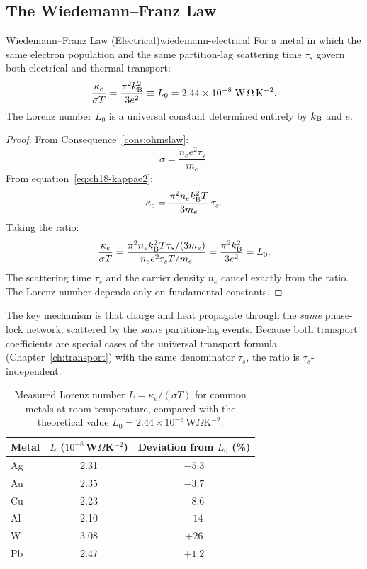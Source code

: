 \subsection{The Wiedemann--Franz Law}

\begin{consequence}{Wiedemann--Franz Law (Electrical)}{wiedemann-electrical}
For a metal in which the same electron population and the same
partition-lag scattering time $\tau_s$ govern both electrical and thermal
transport:
\begin{equation}
  \frac{\kappa_e}{\sigma T} = \frac{\pi^2 k_{\mathrm{B}}^2}{3e^2} \equiv L_0
    = 2.44\times 10^{-8}\;\mathrm{W\,\Omega\,K^{-2}}.
  \label{eq:ch18-wf}
\end{equation}
The Lorenz number $L_0$ is a universal constant determined entirely by
$k_{\mathrm{B}}$ and $e$.
\end{consequence}

\begin{proof}
From Consequence~\ref{cons:ohmslaw}:
\begin{equation}
  \sigma = \frac{n_e e^2\tau_s}{m_e}.
\end{equation}
From equation~\eqref{eq:ch18-kappae2}:
\begin{equation}
  \kappa_e = \frac{\pi^2 n_e k_{\mathrm{B}}^2 T}{3m_e}\,\tau_s.
\end{equation}
Taking the ratio:
\begin{equation}
  \frac{\kappa_e}{\sigma T}
    = \frac{\pi^2 n_e k_{\mathrm{B}}^2 T\tau_s/(3m_e)}
           {n_e e^2\tau_s T/m_e}
    = \frac{\pi^2k_{\mathrm{B}}^2}{3e^2} = L_0.
\end{equation}
The scattering time $\tau_s$ and the carrier density $n_e$ cancel exactly
from the ratio.  The Lorenz number depends only on fundamental constants.
\end{proof}

The key mechanism is that charge and heat propagate through the
\emph{same} phase-lock network, scattered by the \emph{same} partition-lag
events.  Because both transport coefficients are special cases of the
universal transport formula (Chapter~\ref{ch:transport}) with the same
denominator $\tau_s$, the ratio is $\tau_s$-independent.

\begin{table}[htbp]
  \centering
  \caption{Measured Lorenz number $L = \kappa_e/(\sigma T)$ for common
    metals at room temperature, compared with the theoretical value
    $L_0 = 2.44\times 10^{-8}$\,W$\Omega$K$^{-2}$.}
  \label{tab:ch18-lorenz}
  \begin{tabular}{lcc}
    \toprule
    Metal & $L$ ($10^{-8}$\,W$\Omega$K$^{-2}$) &
      Deviation from $L_0$ (\%) \\
    \midrule
    Ag & 2.31 & $-5.3$ \\
    Au & 2.35 & $-3.7$ \\
    Cu & 2.23 & $-8.6$ \\
    Al & 2.10 & $-14$  \\
    W  & 3.08 & $+26$  \\
    Pb & 2.47 & $+1.2$ \\
    \bottomrule
  \end{tabular}
\end{table}

